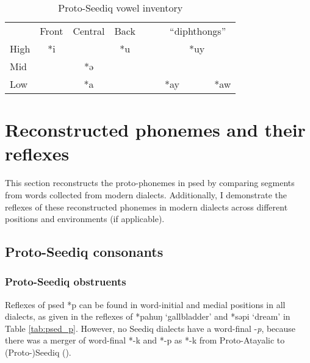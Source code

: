 \begin{table}[!htbp]
\centering
\caption{Proto-Seediq vowel inventory}
\label{tab:psedV}
\begin{tabular}{lcccccccc}
\cline{1-4} \cline{7-9}
     & Front & Central & Back &  &  & \multicolumn{3}{c}{``diphthongs''} \\ \cline{1-4} \cline{7-9}
High & *i    &         & *u   &  &  &            & *uy       &           \\
Mid  &       & *ə      &      &  &  &            &           &           \\
Low  &       & *a      &      &  &  & *ay        &           & *aw       \\ \cline{1-4} \cline{7-9}
\end{tabular}
\end{table}

\section{Reconstructed phonemes and their reflexes} \label{sec:psed_CandV}

This section reconstructs the proto-phonemes in \acl{psed} by comparing segments from words collected from modern dialects. Additionally, I demonstrate the reflexes of these reconstructed phonemes in modern dialects across different positions and environments (if applicable).

\subsection{Proto-Seediq consonants} \label{sec:psedC}

\subsubsection{Proto-Seediq obstruents}

Reflexes of \acl{psed} *p can be found in word-initial and medial positions in all dialects, as given in the reflexes of *pahuŋ `gallbladder' and *səpi `dream' in Table \ref{tab:psed_p}. However, no Seediq dialects have a word-final -\textit{p}, because there was a merger of word-final *-k and *-p as *-k from Proto-Atayalic to (Proto-)Seediq (\cite{li1981paic}). 


